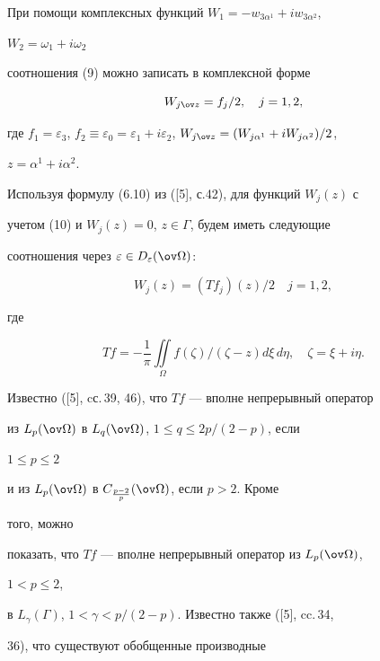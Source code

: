  


При помощи комплексных функций $W_1=-w_{3\alpha^1}+i w_{3\alpha^2}$, 


$W_2=\omega_1+i\omega_2$ 


соотношения (9) можно записать в комплексной форме 


\begin{equation} 


W_{j\ov z}=f_j/2,\quad j=1,2, 


\end{equation} 


где $f_1=\varepsilon_3$, $f_2\equiv \varepsilon_0=\varepsilon_1+i 


\varepsilon_2$, $W_{j\ov z}=(W_{j\alpha^1}+i W_{j\alpha^2})/2$, 


$z=\alpha^1+i\alpha^2$. 


Используя формулу (6.10) из ([5], с.42), для функций $W_j(z)$ с 


учетом (10) и $W_j(z)=0$, $z\in\Gamma$, будем иметь следующие 


соотношения через $\varepsilon\in D_\varepsilon(\ov\Omega)$: 


\begin{equation} 


W_j(z)=(T f_j)(z)/2\quad j=1,2, 


\end{equation} 


где 


$$ 


T f=-\frac{1}{\pi}\iint\limits_\Omega f(\zeta) 


/(\zeta-z)d\xi\,d\eta,\quad \zeta=\xi+i\eta. 


$$ 


Известно ([5], cс.\,39, 46), что $T f$ --- вполне непрерывный оператор 


из $L_p(\ov\Omega)$ в $L_q(\ov\Omega)$, $1\le q\le 2p/(2-p)$, если 


$1\le p\le 2$ 


и из $L_p(\ov\Omega)$ в $C_{\frac{p-2}{p}}(\ov\Omega)$, если $p>2$. Кроме 


того, можно 


показать, что $T f$ --- вполне непрерывный оператор из $L_p(\ov\Omega)$, 


$1<p\le 2$, 


в $L_\gamma(\Gamma)$, $1<\gamma<p/(2-p)$. Известно также ([5], cc.\,34, 


36), что существуют обобщенные производные


